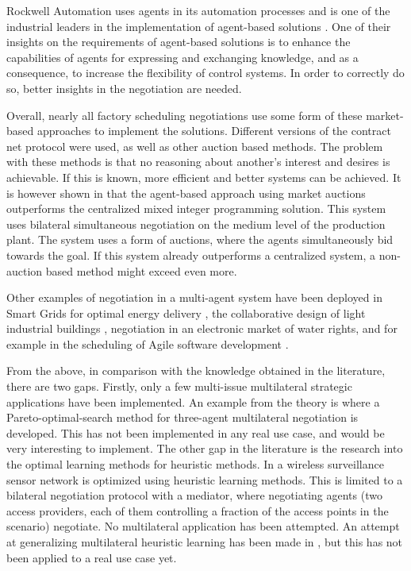 
Rockwell Automation uses agents in its automation processes and is one of the industrial leaders in the implementation of agent-based solutions \citep{vrba2011rockwell}. One of their insights on the requirements of agent-based solutions is to enhance the capabilities of agents for expressing and exchanging knowledge, and as a consequence, to increase the flexibility of control systems. In order to correctly do so, better insights in the negotiation are needed.

Overall, nearly all factory scheduling negotiations use some form of these market-based approaches \citep{monostori2006agent} to implement the solutions. Different versions of the contract net protocol were used, as well as other auction based methods. The problem with these methods is that no reasoning about another's interest and desires is achievable. If this is known, more efficient and better systems can be achieved. It is however shown in \citep{bruccoleri2005production} that the agent-based approach using market auctions outperforms the centralized mixed integer programming solution. This system uses bilateral simultaneous negotiation on the medium level of the production plant. The system uses a form of auctions, where the agents simultaneously bid towards the goal. If this system already outperforms a centralized system, a non-auction based method might exceed even more.

Other examples of negotiation in a multi-agent system have been deployed in Smart Grids for optimal energy delivery \citep{pipattanasomporn2009multi}, the collaborative design of light industrial buildings \citep{anumba2003negotiation}, negotiation in an electronic market of water rights, and for example in the scheduling of Agile software development \citep{rabelo1999multi}.

From the above, in comparison with the knowledge obtained in the literature, there are two gaps. Firstly, only a few multi-issue multilateral strategic applications have been implemented. An example from the theory is \citet{wu2009efficient} where a Pareto-optimal-search method for three-agent multilateral negotiation is developed. This has not been implemented in any real use case, and would be very interesting to implement. The other gap in the literature is the research into the optimal learning methods for heuristic methods. In \citep{de2015automated} a wireless surveillance sensor network is optimized using heuristic learning methods. This is limited to a bilateral negotiation protocol with a mediator, where negotiating agents (two access providers, each of them controlling a fraction of the access points in the scenario) negotiate. No multilateral application has been attempted. An attempt at generalizing multilateral heuristic learning has been made in \citet{beheshti2014homan}, but this has not been applied to a real use case yet. 

